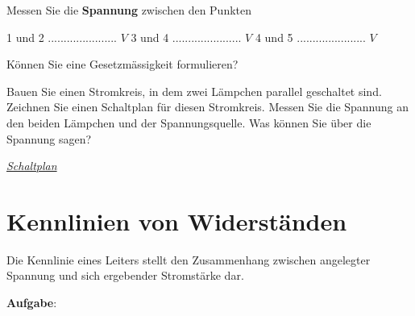 \documentclass[11pt]{article}
\newenvironment{enumerate*}%
  {\begin{enumerate}%
    \setlength{\itemsep}{2pt}%
    \setlength{\parskip}{2pt}}%
  {\end{enumerate}}
\begin{document}
\begin{enumerate*}
	Messen Sie die \textbf{Spannung} zwischen den Punkten \vspace{0.5cm}

	1 und 2 ...................... $V$ \hspace{1cm} 
	3 und 4 ...................... $V$ \hspace{1cm} 
	4 und 5 ...................... $V$ \vspace{0.2cm}

    
Können Sie eine Gesetzmässigkeit formulieren? 



\item Bauen Sie einen Stromkreis, in dem zwei Lämpchen parallel geschaltet sind. Zeichnen Sie einen Schaltplan für diesen Stromkreis. Messen Sie die Spannung an den beiden Lämpchen und der Spannungsquelle. Was können Sie über die Spannung sagen?

\textit{\underline{Schaltplan}}
	\vfill


\end{enumerate*}




\newpage

\section*{Kennlinien von Widerständen}

Die Kennlinie eines Leiters stellt den Zusammenhang zwischen angelegter Spannung und sich ergebender Stromstärke dar.

\textbf{Aufgabe}:
\end{document}
